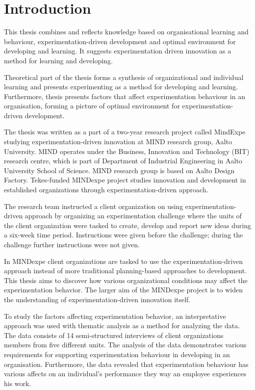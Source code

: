 \chapter{Introduction}
This thesis combines and reflects knowledge based on organisational learning and behaviour, experimentation-driven development and optimal environment for developing and learning. It suggests experimentation driven innovation as a method for learning and developing. 

Theoretical part of the thesis forms a synthesis of organizational and individual learning and presents experimenting as a method for developing and learning. Furthermore, thesis presents factors that affect experimentation behaviour in an organisation, forming a picture of optimal environment for experimentation-driven development. 

The thesis was written as a part of a two-year research project called MindExpe studying experimentation-driven innovation at MIND research group, 
Aalto University. MIND operates under the Business, Innovation and Technology (BIT) research centre, which is part of Department of Industrial Engineering 
in Aalto University School of Science. MIND research group is based on Aalto Design Factory. Tekes-funded MINDexpe project studies innovation and development 
in established organizations through experimentation-driven approach. 

The research team instructed a client organization on using experimentation-driven approach by organizing an experimentation challenge where the units of the 
client organization were tasked to create, develop and report new ideas during a six-week time period. Instructions were given before the challenge; during 
the challenge further instructions were not given. 

In MINDexpe client organizations are tasked to use the experimentation-driven approach instead of more traditional planning-based approaches to development. 
This thesis aims to discover how various organizational conditions may affect the experimentation behavior. The larger aim of the MINDexpe project is to 
widen the understanding of experimentation-driven innovation itself.

To study the factors affecting experimentation behavior, an interpretative approach was used with thematic analysis as a method for analyzing the data. 
The data consists of 14 semi-structured interviews of client organizations members from five different units. The analysis of the data demonstrates various 
requirements for supporting experimentation behaviour in developing in an organisation. Furthermore, the data revealed that experimentation behaviour has various 
affects on an individual's performance they way an employee experiences his work. 

